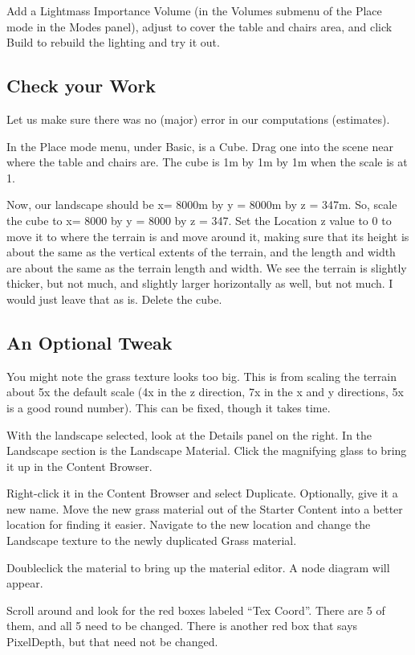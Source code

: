 \documentclass[letter,12pt]{article}
\begin{document}
Add a Lightmass Importance Volume (in the Volumes submenu of the Place mode in the Modes panel), adjust to cover the table and chairs area, and click Build to rebuild the lighting and try it out.

\subsection{Check your Work}

Let us make sure there was no (major) error in our computations (estimates).  

In the Place mode menu, under Basic, is a Cube.  Drag one into the scene near where the table and chairs are.  The cube is 1m by 1m by 1m when the scale is at 1.

Now, our landscape should be x= 8000m by y = 8000m by z = 347m.  So, scale the cube to x= 8000 by y = 8000 by z = 347.  Set the Location z value to 0 to move it to where the terrain is and move around it, making sure that its height is about the same as the vertical extents  of the terrain, and the length and width are about the same as the terrain length and width.  We see the terrain is slightly thicker, but not much, and slightly larger horizontally as well, but not much.  I would just leave that as is.  Delete the cube.

\subsection{An Optional Tweak}

You might note the grass texture looks too big.  This is from scaling the terrain about 5x the default scale (4x in the z direction, 7x in the x and y directions, 5x is a good round number).  This can be fixed, though it takes time.

With the landscape selected, look at the Details panel on the right.  In the Landscape section is the Landscape Material.  Click the magnifying glass to bring it up in the Content Browser.

Right-click it in the Content Browser and select Duplicate.  Optionally, give it a new name.  Move the new grass material out of the Starter Content into a better location for finding it easier.  Navigate to the new location and change the Landscape texture to the newly duplicated Grass material.

Doubleclick the material to bring up the material editor.  A node diagram will appear.

Scroll around and look for the red boxes labeled “Tex Coord”.  There are 5 of them, and all 5 need to be changed.  There is another red box that says PixelDepth, but that need not be changed.
\end{document}
